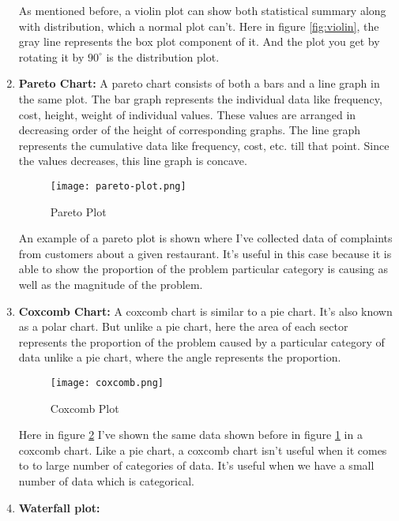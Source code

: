 \begin{tcolorbox}[breakable]
\begin{sol}
\begin{enumerate}
			      As mentioned before, a violin plot can show both
			      statistical summary along with distribution,
			      which a normal plot can't. Here in figure
			      \ref{fig:violin}, the gray line represents the
			      box plot component of it. And the plot you get by
			      rotating it by $90^\circ$ is the distribution
			      plot.
			\item \textbf{Pareto Chart:}
			      A pareto chart consists of both a bars and a line
			      graph in the same plot. The bar graph represents
			      the individual data like frequency, cost, height,
			      weight of individual values. These values are
			      arranged in decreasing order of the height of
			      corresponding graphs. The line graph represents
			      the cumulative data like frequency, cost, etc.
			      till that point. Since the values decreases, this
			      line graph is concave.
			      \begin{figure}[H]
				      \centering
				      \texttt{[image: pareto-plot.png]}
				      \caption{Pareto Plot}
				      \label{fig:pareto}
			      \end{figure}
			      An example of a pareto plot is shown where I've
			      collected data of complaints from customers about
			      a given restaurant. It's useful in this case
			      because it is able to show the proportion of the
			      problem particular category is causing as well as
			      the magnitude of the problem.
			\item \textbf{Coxcomb Chart:}
			      A coxcomb chart is similar to a pie chart. It's
			      also known as a polar chart. But unlike a pie
			      chart, here the area of each sector represents the
			      proportion of the problem caused by a particular
			      category of data unlike a pie chart, where the
			      angle represents the proportion.
			      \begin{figure}[H]
				      \centering
				      \texttt{[image: coxcomb.png]}
				      \caption{Coxcomb Plot}
				      \label{fig:coxcomb}
			      \end{figure}
			      Here in figure \ref{fig:coxcomb} I've shown the
			      same data shown before in figure \ref{fig:pareto}
			      in a coxcomb chart. Like a pie chart, a coxcomb
			      chart isn't useful when it comes to to large
			      number of categories of data. It's useful when we
			      have a small number of data which is categorical.
			\item \textbf{Waterfall plot:}

		\end{enumerate}
	\end{sol}
\end{tcolorbox}
